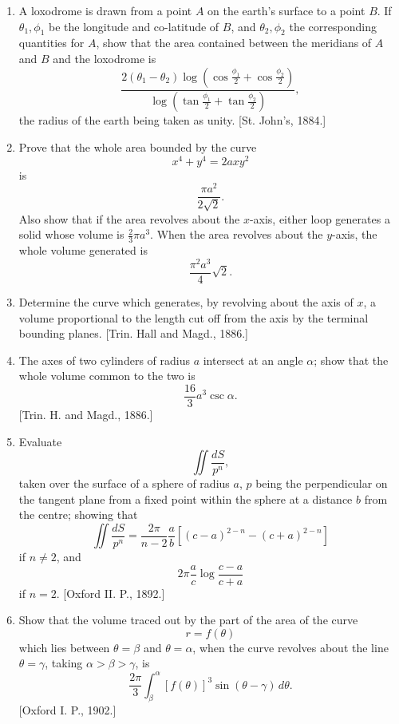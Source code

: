 \documentclass[11pt, a4paper]{article}
\newcommand{\source}[1]{\hfill\textnormal{[#1]}}
\begin{document}
\begin{enumerate}[leftmargin=2em]

\item[20.] A loxodrome is drawn from a point $A$ on the earth's surface to a point $B$. If $\theta_1,\phi_1$ be the longitude and co-latitude of $B$, and $\theta_2,\phi_2$ the corresponding quantities for $A$, show that the area contained between the meridians of $A$ and $B$ and the loxodrome is
\[
\frac{2(\theta_1-\theta_2)\log\left(\cos\frac{\phi_1}{2}+\cos\frac{\phi_2}{2}\right)}
{\log\left(\tan\frac{\phi_1}{2}+\tan\frac{\phi_2}{2}\right)},
\]
the radius of the earth being taken as unity.
\source{St. John's, 1884.}

\item[21.] Prove that the whole area bounded by the curve
\[
x^4+y^4=2axy^2
\]
is
\[
\frac{\pi a^2}{2\sqrt2}.
\]
Also show that if the area revolves about the $x$-axis, either loop generates a solid whose volume is $\frac{2}{3}\pi a^3$. When the area revolves about the $y$-axis, the whole volume generated is
\[
\frac{\pi^2a^3}{4}\sqrt2.
\]

\item[22.] Determine the curve which generates, by revolving about the axis of $x$, a volume proportional to the length cut off from the axis by the terminal bounding planes.
\source{Trin. Hall and Magd., 1886.}

\item[23.] The axes of two cylinders of radius $a$ intersect at an angle $\alpha$; show that the whole volume common to the two is
\[
\frac{16}{3}a^3\csc\alpha.
\]
\source{Trin. H. and Magd., 1886.}

\item[24.] Evaluate
\[
\iint\frac{dS}{p^n},
\]
taken over the surface of a sphere of radius $a$, $p$ being the perpendicular on the tangent plane from a fixed point within the sphere at a distance $b$ from the centre; showing that
\[
\iint\frac{dS}{p^n}
=
\frac{2\pi}{n-2}\frac{a}{b}
\left[(c-a)^{2-n}-(c+a)^{2-n}\right]
\]
if $n\ne2$, 
and
\[
2\pi\frac{a}{c}\log\frac{c-a}{c+a}
\]
if $n=2$.
\source{Oxford II. P., 1892.}

\item[25.] Show that the volume traced out by the part of the area of the curve
\[
r=f(\theta)
\]
which lies between $\theta=\beta$ and $\theta=\alpha$, when the curve revolves about the line $\theta=\gamma$, taking $\alpha>\beta>\gamma$, is
\[
\frac{2\pi}{3}\int_\beta^\alpha [f(\theta)]^3\sin(\theta-\gamma)\,d\theta.
\]
\source{Oxford I. P., 1902.}


\end{enumerate}
\end{document}
